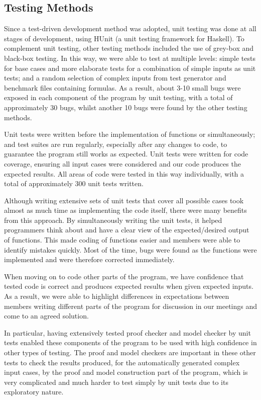 \subsection*{Testing Methods}

Since a test-driven development method was adopted, unit testing was done at all stages of development, using HUnit (a unit testing framework for Haskell). To complement unit testing, other testing methods included the use of grey-box and black-box testing. In this way, we were able to test at multiple levels: simple tests for base cases and more elaborate tests for a combination of simple inputs as unit tests; and a random selection of complex inputs from test generator and benchmark files containing formulas. As a result, about 3-10 small bugs were exposed in each component of the program by unit testing, with a total of approximately 30 bugs, whilst another 10 bugs were found by the other testing methods.

Unit tests were written before the implementation of functions or simultaneously; and test suites are run regularly, especially after any changes to code, to guarantee the program still works as expected. Unit tests were written for code coverage, ensuring all input cases were considered and our code produces the expected results. All areas of code were tested in this way individually, with a total of approximately 300 unit tests written.

Although writing extensive sets of unit tests that cover all possible cases took almost as much time as implementing the code itself, there were many benefits from this approach. By simultaneously writing the unit tests, it helped programmers think about and have a clear view of the expected/desired output of functions. This made coding of functions easier and members were able to identify mistakes quickly. Most of the time, bugs were found as the functions were implemented and were therefore corrected immediately.

When moving on to code other parts of the program, we have confidence that tested code is correct and produces expected results when given expected inputs. As a result, we were able to highlight differences in expectations between members writing different parts of the program for discussion in our meetings and come to an agreed solution.

In particular, having extensively tested proof checker and model checker by unit tests enabled these components of the program to be used with high confidence in other types of testing. The proof and model checkers are important in these other tests to check the results produced, for the automatically generated complex input cases, by the proof and model construction part of the program, which is very complicated and much harder to test simply by unit tests due to its exploratory nature.

